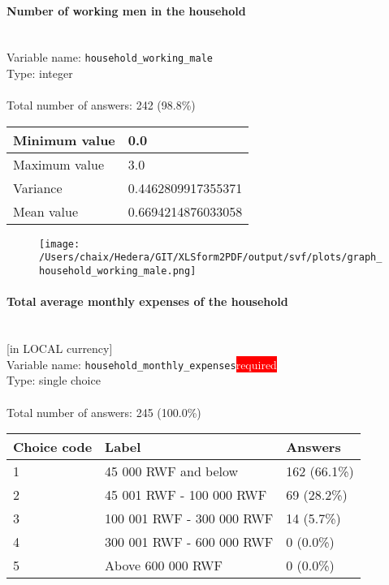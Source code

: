 \documentclass[11.5pt, a4paper]{scrartcl}
\begin{document}
\paragraph{Number of working men in the household}
\  \\Variable name: \texttt{household\_working\_male}\\
Type: integer\\
\\Total number of answers: 242 (98.8\%)
\\[0.2em] \begin{tabular}{p{4cm}|p{8cm}}
Minimum value &0.0 \\
\hline
\cellcolor{mygray} Maximum value & \cellcolor{mygray}3.0 \\
\hline
Variance &0.4462809917355371 \\
\hline
\cellcolor{mygray} Mean value & \cellcolor{mygray}0.6694214876033058 \\
\hline
\end{tabular}
\begin{figure}[H]
\centering
\texttt{[image: /Users/chaix/Hedera/GIT/XLSform2PDF/output/svf/plots/graph\_household\_working\_male.png]}
\end{figure}
\paragraph{Total average monthly expenses of the household }
\ \\ {\small [in LOCAL currency]}
\  \\Variable name: \texttt{household\_monthly\_expenses}\hfill\colorbox{red}{\small{\textcolor{white}{required}}}\\
 Type: single choice\\
\\Total number of answers: 245 (100.0\%)
\\[0.2em] \begin{tabular}{p{4cm}|p{8cm}|p{3cm}}
Choice code & Label & Answers \\
\hline
1 & 45 000 RWF and below& \cellcolor{color3}162 (66.1\%)\\
\cellcolor{mygray} 2 & \cellcolor{mygray}45 001 RWF - 100 000 RWF & \cellcolor{color1}69 (28.2\%)\\
3 & 100 001 RWF - 300 000 RWF& \cellcolor{color0}14 (5.7\%)\\
\cellcolor{mygray} 4 & \cellcolor{mygray}300 001 RWF - 600 000 RWF & \cellcolor{color0}0 (0.0\%)\\
5 & Above 600 000 RWF& \cellcolor{color0}0 (0.0\%)\\
\end{tabular}
\end{document}
